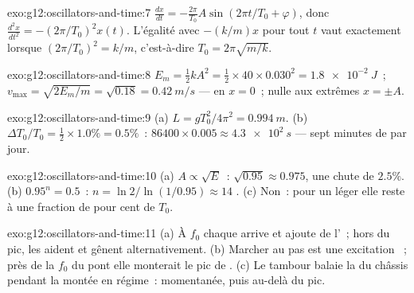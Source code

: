 \begin{solution}{exo:g12:oscillators-and-time:7}
$\frac{dx}{dt} = -\frac{2\pi}{T_0}A\sin(2\pi t/T_0 + \varphi)$, donc
$\frac{d^2x}{dt^2} = -(2\pi/T_0)^2 x(t)$. L'égalité avec $-(k/m)x$
pour tout $t$ vaut exactement lorsque $(2\pi/T_0)^2 = k/m$,
c'est-à-dire $T_0 = 2\pi\sqrt{m/k}$.
\end{solution}

\begin{solution}{exo:g12:oscillators-and-time:8}
$E_m = \tfrac12 kA^2 = \tfrac12 \times 40 \times 0.030^2 =
\qty{1.8e-2}{J}$~; $v_{\max} = \sqrt{2E_m/m} = \sqrt{0.18} =
\qty{0.42}{m/s}$ --- en $x = 0$~; nulle aux extrêmes $x = \pm A$.
\end{solution}

\begin{solution}{exo:g12:oscillators-and-time:9}
(a) $L = gT_0^2/4\pi^2 = \qty{0.994}{m}$. (b) $\Delta T_0/T_0 =
\tfrac12 \times 1.0\% = 0.5\%$~: $86400 \times 0.005 \approx
\qty{4.3e2}{s}$ --- sept minutes de  par jour.
\end{solution}

\begin{solution}{exo:g12:oscillators-and-time:10}
(a) $A \propto \sqrt{E}$~: $\sqrt{0.95} \approx 0.975$, une chute
de $2.5\%$. (b) $0.95^n = 0.5$~: $n = \ln 2/\ln(1/0.95) \approx 14$
. (c) Non~: pour un  léger elle
reste à une fraction de pour cent de $T_0$.
\end{solution}

\begin{solution}{exo:g12:oscillators-and-time:11}
(a) À $f_0$ chaque  arrive  et ajoute de
l'~; hors du pic, les  aident et gênent
alternativement. (b) Marcher au pas est une excitation
~; près de la $f_0$ du pont elle monterait le pic de
. (c) Le tambour balaie la
 du châssis pendant la montée en
régime~:  momentanée, puis au-delà du pic.
\end{solution}

